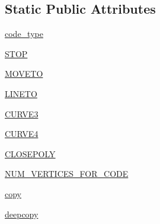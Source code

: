\subsection*{Static Public Attributes}
\begin{DoxyCompactItemize}
\item 
\hyperlink{classmatplotlib_1_1path_1_1Path_a89ee1cccd6a24fe1f278d18d77d84438}{code\+\_\+type}
\item 
\hyperlink{classmatplotlib_1_1path_1_1Path_a9c0f0350d40f9d676f842f7a191cea97}{S\+T\+OP}
\item 
\hyperlink{classmatplotlib_1_1path_1_1Path_ab9e9c539ff8aa6ea04fbe89d48e20221}{M\+O\+V\+E\+TO}
\item 
\hyperlink{classmatplotlib_1_1path_1_1Path_af32d8730490de4520b4ef5d4b4a85a96}{L\+I\+N\+E\+TO}
\item 
\hyperlink{classmatplotlib_1_1path_1_1Path_a8fd69ee9fc2a1051a8d67d12910bab4e}{C\+U\+R\+V\+E3}
\item 
\hyperlink{classmatplotlib_1_1path_1_1Path_aec98baae7ae38e7a0ae680fc945f051e}{C\+U\+R\+V\+E4}
\item 
\hyperlink{classmatplotlib_1_1path_1_1Path_a02575b90932a2331c8e95fce7b11848c}{C\+L\+O\+S\+E\+P\+O\+LY}
\item 
\hyperlink{classmatplotlib_1_1path_1_1Path_a2a774a55a2a3a2a45aee32b83609f36e}{N\+U\+M\+\_\+\+V\+E\+R\+T\+I\+C\+E\+S\+\_\+\+F\+O\+R\+\_\+\+C\+O\+DE}
\item 
\hyperlink{classmatplotlib_1_1path_1_1Path_a1d7b1c4c674a0f49a14a8e63cb077d80}{copy}
\item 
\hyperlink{classmatplotlib_1_1path_1_1Path_ae9b78245ec8753fe8b5c84755a5f36f3}{deepcopy}
\end{DoxyCompactItemize}


